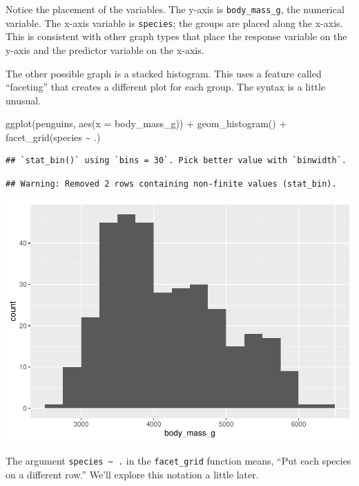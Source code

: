 \documentclass[
]{book}
\newenvironment{Shaded}{\begin{snugshade}}{\end{snugshade}}
\newcommand{\AttributeTok}[1]{\textcolor[rgb]{0.77,0.63,0.00}{#1}}
\newcommand{\FunctionTok}[1]{\textcolor[rgb]{0.00,0.00,0.00}{#1}}
\newcommand{\NormalTok}[1]{#1}
\newcommand{\SpecialCharTok}[1]{\textcolor[rgb]{0.00,0.00,0.00}{#1}}
\begin{document}
Notice the placement of the variables. The y-axis is \texttt{body\_mass\_g}, the numerical variable. The x-axis variable is \texttt{species}; the groups are placed along the x-axis. This is consistent with other graph types that place the response variable on the y-axis and the predictor variable on the x-axis.

The other possible graph is a stacked histogram. This uses a feature called ``faceting'' that creates a different plot for each group. The syntax is a little unusual.

\begin{Shaded}
\begin{Highlighting}[]
\FunctionTok{ggplot}\NormalTok{(penguins, }\FunctionTok{aes}\NormalTok{(}\AttributeTok{x =}\NormalTok{ body\_mass\_g)) }\SpecialCharTok{+}
    \FunctionTok{geom\_histogram}\NormalTok{() }\SpecialCharTok{+}
    \FunctionTok{facet\_grid}\NormalTok{(species }\SpecialCharTok{\textasciitilde{}}\NormalTok{ .)}
\end{Highlighting}
\end{Shaded}

\begin{verbatim}
## `stat_bin()` using `bins = 30`. Pick better value with `binwidth`.
\end{verbatim}

\begin{verbatim}
## Warning: Removed 2 rows containing non-finite values (stat_bin).
\end{verbatim}

\includegraphics{intro_stats_files/figure-latex/unnamed-chunk-108-1.pdf}

The argument \texttt{species\ \textasciitilde{}\ .} in the \texttt{facet\_grid} function means, ``Put each species on a different row.'' We'll explore this notation a little later.
\end{document}
